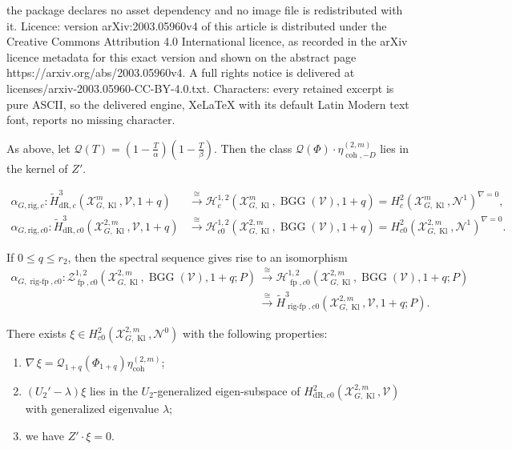 \documentclass[10pt,a4paper]{amsart}
\DeclareMathOperator{\BGG}{BGG}
\DeclareMathOperator{\Kl}{Kl}
\DeclareMathOperator{\coh}{coh}
\DeclareMathOperator{\fp}{fp}
\DeclareMathOperator{\rigfp}{rig-fp}
\newcommand{\cH}{\mathcal{H}}
\newcommand{\cN}{\mathcal{N}}
\newcommand{\cQ}{\mathcal{Q}}
\newcommand{\cV}{\mathcal{V}}
\newcommand{\cX}{\mathcal{X}}
\newcommand{\dR}{\mathrm{dR}}
\newcommand{\rig}{\mathrm{rig}}
\newcommand{\wH}{\widetilde{H}}
\renewcommand{\leq}{\leqslant}
\begin{document}
the package declares no asset dependency and no image file is redistributed with it. Licence: version arXiv:2003.05960v4 of this article is distributed under the Creative Commons Attribution 4.0 International licence, as recorded in the arXiv licence metadata for this exact version and shown on the abstract page https://arxiv.org/abs/2003.05960v4. A full rights notice is delivered at licenses/arxiv-2003.05960-CC-BY-4.0.txt. Characters: every retained excerpt is pure ASCII, so the delivered engine, XeLaTeX with its default Latin Modern text font, reports no missing character.
  \begin{proposition}\label{prop:kerZ} As above, let $\cQ(T)=(1 - \tfrac{T}{\alpha})( 1 - \tfrac{T}{\beta})$. Then the class $\cQ(\Phi)\cdot \eta^{(2, m)}_{\coh,-D}$ lies in the kernel of $Z'$.
  \end{proposition}

    \begin{align}
    \alpha_{G, \rig, c}: \wH^{3}_{\dR,c}(\cX_{G,\Kl}^m,\cV,1+q)
    &\xrightarrow{\,\cong\,} \cH^{1,2}_c(\cX_{G,\Kl}^m,\BGG(\cV), 1+q) = H_c^2\left(\cX_{G,\Kl}^m,\cN^1\right)^{\nabla=0},\label{eq:cohrigiso1}\\
    \alpha_{G, \rig, c0}: \wH^{3}_{\dR,c0}(\cX_{G,\Kl}^{2,m},\cV,1+q)
    &\xrightarrow{\,\cong\,} \cH^{1,2}_{c0}(\cX_{G,\Kl}^{2,m},\BGG(\cV), 1+q) = H_{c0}^2\left(\cX_{G,\Kl}^{2,m},\cN^1\right)^{\nabla=0}.\label{eq:cohrigiso2}
    \end{align}

   \begin{corollary}
    \label{cor:fppairmapsS}
    If $0\leq q\leq r_2$, then the spectral sequence gives rise to an isomorphism
    \begin{align*}
     \alpha_{G, \rigfp, c0}: \mathscr{Z}^{1, 2}_{\fp,c0}(\cX_{G,\Kl}^{2,m}, \BGG(\cV),1+q; P)
     & \xrightarrow{\,\cong\,} \cH^{1, 2}_{\fp,c0}(\cX_{G,\Kl}^{2,m}, \BGG(\cV),1+q;P)\\
     & \xrightarrow{\,\cong\,} \wH^{3}_{\rigfp, c0}(\cX_{G,\Kl}^{2,m}, \cV,1+q; P).
    \end{align*}
   \end{corollary}

  \begin{proposition}\label{prop:goodxi}
 There exists $\xi\in  H^2_{c0}(\cX^{2,m}_{G,\Kl},\cN^0)$ with the following properties:
 \begin{enumerate}
  \item $\nabla\, \xi=\cQ_{1+q}(\Phi_{1+q})\eta_{\coh}^{(2,m)}$;
  \item $(U_2'-\lambda)\xi$ lies in the $U_2$-generalized eigen-subspace of $H^2_{\dR,c0}(\cX^{2,m}_{G,\Kl},\cV)$ with generalized eigenvalue $\lambda$;
  \item we have $Z'\cdot\xi=0$.
 \end{enumerate}
\end{proposition}
\end{document}
